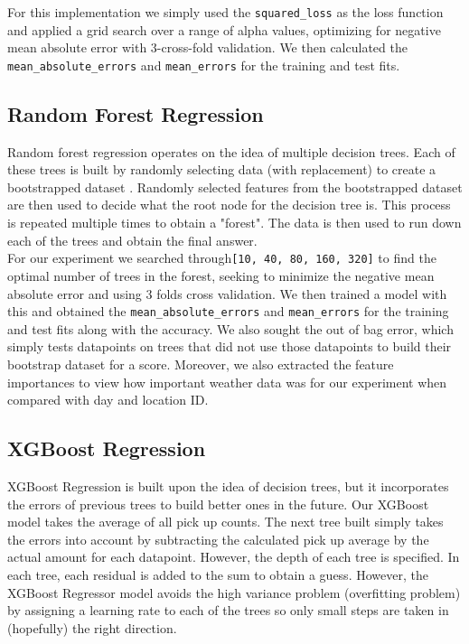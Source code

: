 \documentclass[journal]{IEEEtran}
\newcommand{\cc}[1]{\texttt{#1}}
\begin{document}
\noindent For this implementation we simply used the \cc{squared\_loss} as the loss function and applied a grid search over a range of alpha values, optimizing for negative mean absolute error with 3-cross-fold validation. We then calculated the \cc{mean\_absolute\_errors} and \cc{mean\squared\_errors} for the training and test fits. \\

\subsection{Random Forest Regression}

\noindent Random forest regression operates on the idea of multiple decision trees. Each of these trees is built by randomly selecting data (with replacement) to create a bootstrapped dataset \cite{randomforest}. Randomly selected features from the bootstrapped dataset are then used to decide what the root node for the decision tree is. This process is repeated multiple times to obtain a "forest". The data is then used to run down each of the trees and obtain the final answer.\\

\noindent For our experiment we searched through\cc{[10, 40, 80, 160, 320]} to find the optimal number of trees in the forest, seeking to minimize the negative mean absolute error and using 3 folds cross validation. We then trained a model with this and obtained the \cc{mean\_absolute\_errors} and \cc{mean\squared\_errors} for the training and test fits along with the accuracy. We also sought the out of bag error, which simply tests datapoints on trees that did not use those datapoints to build their bootstrap dataset for a score. Moreover, we also extracted the feature importances to view how important weather data was for our experiment when compared with day and location ID. \\

\subsection{XGBoost Regression}

\noindent XGBoost Regression is built upon the idea of decision trees, but it incorporates the errors of previous trees to build better ones in the future. Our XGBoost model takes the average of all pick up counts. The next tree built simply takes the errors into account by subtracting the calculated pick up average by the actual amount for each datapoint. However, the depth of each tree is specified. In each tree, each residual is added to the sum to obtain a guess. However, the XGBoost Regressor model avoids the high variance problem (overfitting problem) by assigning a learning rate to each of the trees so only small steps are taken in (hopefully) the right direction.\\
\end{document}
